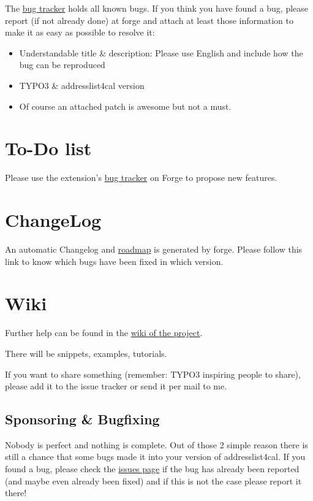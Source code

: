 \documentclass[a4paper,10pt,english]{sphinxtypo3manual}
\begin{document}
The \href{http://forge.typo3.org/projects/extension-addresslist4cal/issues}{bug tracker} holds all known bugs. If you think you have found a bug,
please report (if not already done) at forge and attach at least those information
to make it as easy as possible to resolve it:
\begin{itemize}
\item {} 
Understandable title \& description: Please use English and include how
the bug can be reproduced

\item {} 
TYPO3 \& addresslist4cal version

\item {} 
Of course an attached patch is awesome but not a must.

\end{itemize}


\chapter{To-Do list}
\label{index:to-do-list}
Please use the extension's \href{http://forge.typo3.org/projects/extension-addresslist4cal/issues}{bug tracker} on Forge to propose new features.


\chapter{ChangeLog}
\label{index:bug-tracker}\label{index:changelog}
An automatic Changelog and \href{http://forge.typo3.org/projects/extension-addresslist4cal/roadmap}{roadmap} is generated by forge. Please
follow this link to know which bugs have been fixed in which version.


\chapter{Wiki}
\label{index:wiki}\label{index:roadmap}
Further help can be found in the \href{http://forge.typo3.org/projects/extension-addresslist4cal/wiki}{wiki of the project}.

There will be snippets, examples, tutorials.

If you want to share something (remember: TYPO3 inspiring people to
share), please add it to the issue tracker or send it per mail to me.


\section{Sponsoring \& Bugfixing}
\label{index:sponsoring-bugfixing}
Nobody is perfect and nothing is complete. Out of those 2 simple
reason there is still a chance that some bugs made it into your
version of addresslist4cal. If you found a bug, please check the \href{http://forge.typo3.org/projects/extension-addresslist4cal/issues}{issues page}
if the bug has already been reported (and maybe even already been fixed) and if
this is not the case please report it there!
\end{document}
